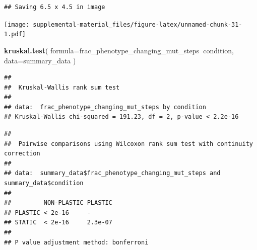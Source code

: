 \documentclass[]{book}
\newenvironment{Shaded}{\begin{snugshade}}{\end{snugshade}}
\newcommand{\DataTypeTok}[1]{\textcolor[rgb]{0.13,0.29,0.53}{#1}}
\newcommand{\KeywordTok}[1]{\textcolor[rgb]{0.13,0.29,0.53}{\textbf{#1}}}
\newcommand{\NormalTok}[1]{#1}
\newcommand{\OperatorTok}[1]{\textcolor[rgb]{0.81,0.36,0.00}{\textbf{#1}}}
\newcommand{\StringTok}[1]{\textcolor[rgb]{0.31,0.60,0.02}{#1}}
\begin{document}
\begin{verbatim}
## Saving 6.5 x 4.5 in image
\end{verbatim}

\texttt{[image: supplemental-material\_files/figure-latex/unnamed-chunk-31-1.pdf]}

\begin{Shaded}
\begin{Highlighting}[]
\KeywordTok{kruskal.test}\NormalTok{(}
  \DataTypeTok{formula=}\NormalTok{frac_phenotype_changing_mut_steps}\OperatorTok{~}\NormalTok{condition,}
  \DataTypeTok{data=}\NormalTok{summary_data}
\NormalTok{)}
\end{Highlighting}
\end{Shaded}

\begin{verbatim}
## 
##  Kruskal-Wallis rank sum test
## 
## data:  frac_phenotype_changing_mut_steps by condition
## Kruskal-Wallis chi-squared = 191.23, df = 2, p-value < 2.2e-16
\end{verbatim}

\begin{Shaded}
\end{Shaded}

\begin{verbatim}
## 
##  Pairwise comparisons using Wilcoxon rank sum test with continuity correction 
## 
## data:  summary_data$frac_phenotype_changing_mut_steps and summary_data$condition 
## 
##         NON-PLASTIC PLASTIC
## PLASTIC < 2e-16     -      
## STATIC  < 2e-16     2.3e-07
## 
## P value adjustment method: bonferroni
\end{verbatim}
\end{document}
